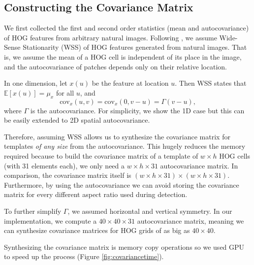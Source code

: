 \documentclass[10pt,twocolumn,letterpaper]{article}
\begin{document}
\subsection{Constructing the Covariance Matrix}
\label{sec:feature_statistics}
We first collected the first and second order statistics (mean and autocovariance) of HOG features from arbitrary natural images. Following \cite{Hariharan12}, we assume Wide-Sense Stationarity (WSS) of HOG features generated from natural images. That is, we assume the mean of a HOG cell is independent of its place in the image, and the autocovariance of patches depends only on their relative location.

In one dimension, let $x(u)$ be the feature at location $u$. Then WSS states that $\mathbb{E}\left[x(u)\right] = \mu_x$ for all $u$, and
\begin{equation}
\textrm{cov}_x(u,v) = \textrm{cov}_x(0, v-u) = \Gamma(v-u),
\end{equation} where $\Gamma$ is the autocovariance. For simplicity, we show the 1D case but this can be easily extended to 2D spatial autocovariance.

Therefore, assuming WSS allows us to synthesize the covariance matrix for templates \emph{of any size} from the autocovariance. This hugely reduces the memory required because to build the covariance matrix of a template of $w \times h$ HOG cells (with 31 elements each), we only need a $w \times h \times 31$ autocovariance matrix. In comparison, the covariance matrix itself is $(w \times h \times 31) \times (w \times h \times 31)$. Furthermore, by using the autocovariance we can avoid storing the covariance matrix for every different aspect ratio used during detection.

To further simplify $\Gamma$, we assumed horizontal and vertical symmetry. In our implementation, we compute a $40 \times 40 \times 31$ autocovariance matrix, meaning we can synthesize covariance matrices for HOG grids of as big as $40 \times 40$.

Synthesizing the covariance matrix is memory copy operations so we used GPU to speed up the process (Figure \ref{fig:covariancetime}).



\end{document}
